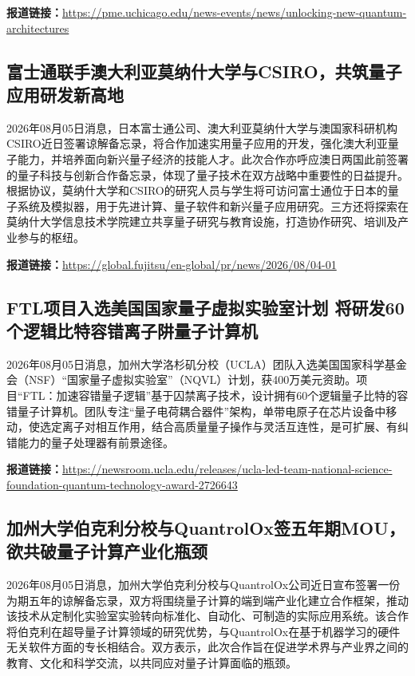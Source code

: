\documentclass[12pt,a4paper]{ctexart}
\begin{document}
\noindent\textbf{报道链接：}\url{https://pme.uchicago.edu/news-events/news/unlocking-new-quantum-architectures}

\subsection{ 富士通联手澳大利亚莫纳什大学与CSIRO，共筑量子应用研发新高地 }

2026年08月05日消息，日本富士通公司、澳大利亚莫纳什大学与澳国家科研机构CSIRO近日签署谅解备忘录，将合作加速实用量子应用的开发，强化澳大利亚量子能力，并培养面向新兴量子经济的技能人才。此次合作亦呼应澳日两国此前签署的量子科技与创新合作备忘录，体现了量子技术在双方战略中重要性的日益提升。根据协议，莫纳什大学和CSIRO的研究人员与学生将可访问富士通位于日本的量子系统及模拟器，用于先进计算、量子软件和新兴量子应用研究。三方还将探索在莫纳什大学信息技术学院建立共享量子研究与教育设施，打造协作研究、培训及产业参与的枢纽。

\noindent\textbf{报道链接：}\url{https://global.fujitsu/en-global/pr/news/2026/08/04-01}

\subsection{ FTL项目入选美国国家量子虚拟实验室计划 将研发60个逻辑比特容错离子阱量子计算机 }

2026年08月05日消息，加州大学洛杉矶分校（UCLA）团队入选美国国家科学基金会（NSF）“国家量子虚拟实验室”（NQVL）计划，获400万美元资助。项目“FTL：加速容错量子逻辑”基于囚禁离子技术，设计拥有60个逻辑量子比特的容错量子计算机。团队专注“量子电荷耦合器件”架构，单带电原子在芯片设备中移动，使选定离子对相互作用，结合高质量量子操作与灵活互连性，是可扩展、有纠错能力的量子处理器有前景途径。

\noindent\textbf{报道链接：}\url{https://newsroom.ucla.edu/releases/ucla-led-team-national-science-foundation-quantum-technology-award-2726643}

\subsection{ 加州大学伯克利分校与QuantrolOx签五年期MOU，欲共破量子计算产业化瓶颈 }

2026年08月05日消息，加州大学伯克利分校与QuantrolOx公司近日宣布签署一份为期五年的谅解备忘录，双方将围绕量子计算的端到端产业化建立合作框架，推动该技术从定制化实验室实验转向标准化、自动化、可制造的实际应用系统。该合作将伯克利在超导量子计算领域的研究优势，与QuantrolOx在基于机器学习的硬件无关软件方面的专长相结合。双方表示，此次合作旨在促进学术界与产业界之间的教育、文化和科学交流，以共同应对量子计算面临的瓶颈。
\end{document}
